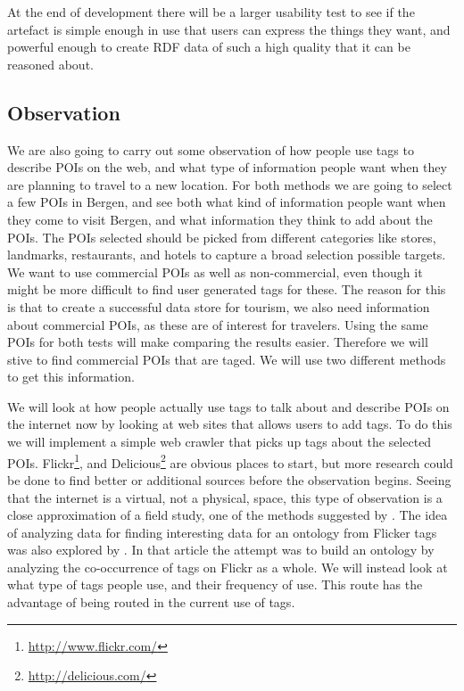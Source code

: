 At the end of development there will be a larger usability test to see if the artefact is simple enough in use that
users can express the things they want, and powerful enough to create RDF data of such a high quality that it can be reasoned about.


\subsection{Observation}
We are also going to carry out some observation of how people use tags to describe POIs on the web, 
and what type of information people want when they are planning to travel to a new location.
For both methods we are going to select a few POIs in Bergen, and see both what kind of information people want when they come to visit Bergen,
and what information they think to add about the POIs.
The POIs selected should be picked from different categories like stores, landmarks, restaurants, and hotels to capture a broad selection possible targets.
We want to use commercial POIs as well as non-commercial, even though it might be more difficult to find user generated tags for these.
The reason for this is that to create a successful data store for tourism, we also need information about commercial POIs, as these are of interest for travelers.
Using the same POIs for both tests will make comparing the results easier. 
Therefore we will stive to find commercial POIs that are taged.
We will use two different methods to get this information.

We will look at how people actually use tags to talk about and describe POIs on the internet now by looking at web sites that allows users to add tags. 
To do this we will implement a simple web crawler that picks up tags about the selected POIs.
Flickr\footnote{\url{http://www.flickr.com/}}, and Delicious\footnote{\url{http://delicious.com/}} are obvious places to start, 
but more research could be done to find better or additional sources before the observation begins.
Seeing that the internet is a virtual, not a physical, space, this type of observation is a close approximation of a field study, one of the methods suggested by \citet{Chen1990}.
The idea of analyzing data for finding interesting data for an ontology from Flicker tags was also explored by \citet{Schmitz2006}. 
In that article the attempt was to build an ontology by analyzing the co-occurrence of tags on Flickr as a whole. 
We will instead look at what type of tags people use, and their frequency of use.
This route has the advantage of being routed in the current use of tags. 

